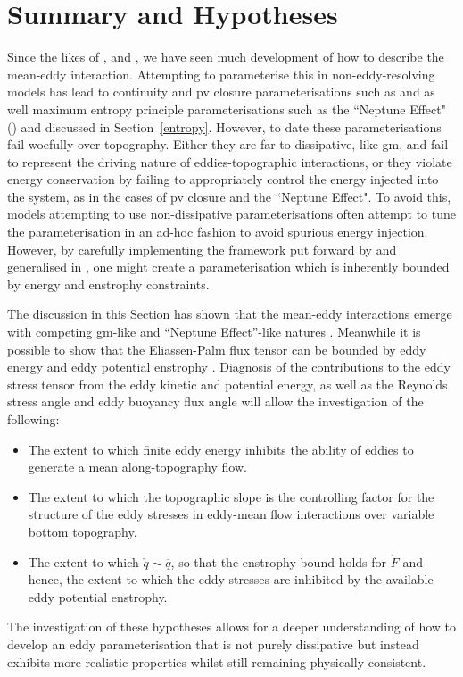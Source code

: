 \documentclass[12pt,a4paper]{report}
\newcommand*\thkmean[1]{\overline{#1}}
\newcommand*\spec[1]{\mathring{#1}}
\begin{document}
                       
                     


\section{Summary and Hypotheses}
\label{hypotheses}

Since the likes of \cite{young1982shear}, \cite{holloway1987systematic} and
\cite{gent1990}, we have seen much development of how to describe the mean-eddy interaction.
Attempting to parameterise this in non-eddy-resolving models has lead to 
continuity and \gls{pv} closure parameterisations such as \cite{gent1990}
and \cite{greatbatch1998exploring} as well maximum entropy principle parameterisations 
such as the ``Neptune Effect" (\cite{holloway1992representing}) and \cite{polyakov2001eddy} discussed in Section~\ref{entropy}.
However, to date these parameterisations fail woefully over topography. Either
they are far to dissipative, like \gls{gm}, and fail to represent the driving nature
of eddies-topographic interactions, or they violate energy conservation
by failing to appropriately control the energy injected into the system, as in the cases
of \gls{pv} closure and the ``Neptune Effect". To avoid this, models attempting to
use non-dissipative parameterisations often attempt to tune the parameterisation in
an ad-hoc fashion to avoid spurious energy injection. However, by carefully implementing
the framework put forward by \cite{marshall2012framework} and generalised in
\cite{maddison2013eliassen}, one might create a parameterisation which is
inherently bounded by energy and enstrophy constraints.

The discussion in this Section has shown that the mean-eddy interactions 
emerge with competing \gls{gm}-like and ``Neptune Effect''-like natures
\cite{adcock2000interactions}. Meanwhile  it is possible to show that
the Eliassen-Palm flux tensor can be bounded by eddy energy and eddy potential enstrophy
\cite{marshall2012framework}.
Diagnosis of the contributions to the eddy stress tensor from
the eddy kinetic and potential energy, as well as the Reynolds stress angle and eddy buoyancy flux angle will allow the investigation of the following:
\begin{itemize} 
	\item The extent to which finite eddy energy inhibits the ability of eddies to
	generate a mean along-topography flow.
		\item The extent to which the topographic slope is the controlling factor for the structure of the eddy stresses in eddy-mean flow interactions over variable bottom topography.
	    \item The extent to which $\spec{q} \sim \thkmean{q}$, so that the enstrophy bound holds for $\spec{F}$ and hence, the extent to which the eddy stresses are inhibited by the available eddy potential enstrophy.
\end{itemize} 
The investigation of these hypotheses allows for a deeper understanding of
how to develop an eddy parameterisation that is not purely dissipative but instead exhibits
more realistic properties whilst still remaining physically consistent. 
 
\end{document}
